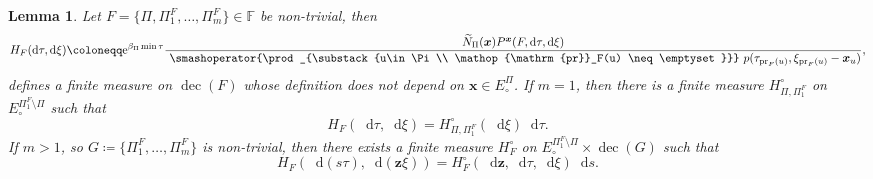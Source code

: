 \documentclass[reqno,draft]{amsart}
\numberwithin{equation}{section}
\theoremstyle{plain}
\newtheorem{lemma}[theorem]{Lemma}
\theoremstyle{remark}
\newcommand*\diff{\mathop{}\!\mathrm{d}}
\newcommand{\e}{\mathrm{e}}
\DeclareMathOperator{\pr}{pr}
\newcommand{\fpart}{\Pi} %
\DeclareMathOperator{\dcb}{dec}
\newcommand{\smashop}[1]{\,\,\smashoperator{#1}\,\,}
\newcommand{\nn}{\widetilde{N}} %
\begin{document}
\def\hf{H^\circ}
\def\he{H^\circ}
\begin{lemma}\label{lem:HF}
    Let $F = \{\fpart,\fpart_1^F, \ldots ,\fpart_m^F\} \in \mathbb{F}$ be non-trivial, then
    \begin{equation*}%
        H_F(\diff \tau,\diff \xi) \coloneqq \e^{\beta_{\fpart}\min \tau} \frac{\nn_\fpart(\boldsymbol x) P^{\boldsymbol x}(F,\diff \tau,\diff \xi)}{\smashop{\prod_{\substack{u\in \fpart \\ \pr_F(u) \neq \emptyset }}} p(\tau_{\pr_F(u)}, \xi_{\pr_F(u)}-\boldsymbol x_u)},
    \end{equation*}
    defines a finite measure on $\dcb(F)$ whose definition does not depend on $\boldsymbol x \in E^{\fpart}_\circ $. If $m = 1$, then there is a finite measure $\he_{\fpart,\fpart_1^F}$ on $E^{\fpart_1^F\setminus \fpart}_\circ $ such that \[
        H_F(\diff \tau,\diff \xi) = \he_{\fpart,\fpart_1^F}(\diff \xi)\diff \tau.
        \] If $m > 1$, so $G \coloneqq \{\fpart_1^F, \ldots ,\fpart_m^F\}$ is non-trivial, then there exists a finite measure $\hf_F$ on $E^{\fpart_1^F\setminus \fpart}_\circ \times \dcb(G)$ such that \[
        H_F(\diff (s\tau),\diff (\boldsymbol z\xi)) = \hf_F(\diff \boldsymbol z,\diff \tau,\diff \xi) \diff s.
    \]
\end{lemma}
\end{document}
